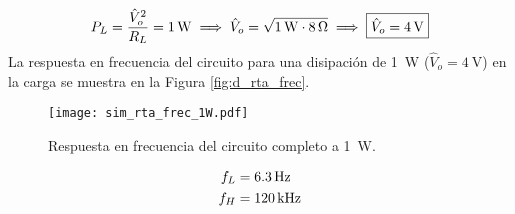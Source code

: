 \begin{equation}
	\centering
	P_L = \frac{ {\hat{V}_o}^{2} }{R_L} = \SI{1}{\watt} \implies \hat{V}_o = \sqrt{\SI{1}{\watt} \cdot \SI{8}{\ohm}} \implies \boxed{\hat{V}_o = \SI{4}{\volt}}
\end{equation}
La respuesta en frecuencia del circuito para una disipación de \SI{1}{\watt} ($\hat{V}_o = \SI{4}{\volt}$) en la carga se muestra en la Figura \ref{fig:d_rta_frec}.

\begin{figure}[H]	
	\centering
	\texttt{[image: sim\_rta\_frec\_1W.pdf]}
	\caption{Respuesta en frecuencia del circuito completo a \SI{1}{\watt}.}
	\label{fig:rta_frec}
\end{figure}

\begin{align}
	\centering
	f_{L} & = \SI{6.3}{\hertz}\\
	f_H & = \SI{120}{\kilo\hertz}
\end{align}
